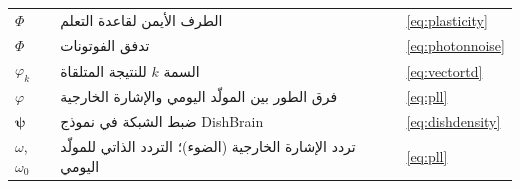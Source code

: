 \begin{center}
\begin{longtable}{>{\raggedright}p{2.0cm}>{\raggedright}p{9.6cm}>{\raggedright\arraybackslash}p{2.4cm}}
$\Phi$ & الطرف الأيمن لقاعدة التعلم & \eqref{eq:plasticity} \\
$\Phi$ & تدفق الفوتونات & \eqref{eq:photonnoise} \\
$\varphi_k$ & السمة $k$ للنتيجة المتلقاة & \eqref{eq:vectortd} \\
$\varphi$ & فرق الطور بين المولّد اليومي والإشارة الخارجية & \eqref{eq:pll} \\
$\boldsymbol\psi$ & ضبط الشبكة في نموذج \foreignlanguage{english}{DishBrain} & \eqref{eq:dishdensity} \\
$\omega$, $\omega_0$ & تردد الإشارة الخارجية (الضوء)؛ التردد الذاتي للمولّد اليومي & \eqref{eq:pll} \\
\end{longtable}
\end{center}
